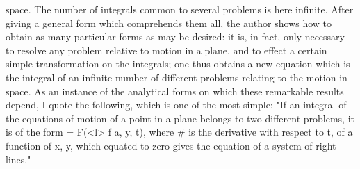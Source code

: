 \documentclass[12pt,a4paper]{article}
\theoremstyle{definition}
\begin{document}
space. The number of integrals common to several problems is here infinite. After
giving a general form which comprehends them all, the author shows how to obtain
as many particular forms as may be desired: it is, in fact, only necessary to resolve
any problem relative to motion in a plane, and to effect a certain simple transformation
on the integrals; one thus obtains a new equation which is the integral of an
infinite number of different problems relating to the motion in space.
As an instance of the analytical forms on which these remarkable results depend,
I quote the following, which is one of the most simple: "If an integral of the
equations of motion of a point in a plane belongs to two different problems, it is of
the form
=
F(<l> f a, y, t),
where # is the derivative with respect to t, of a function of x, y, which equated to
zero gives the equation of a system of right lines."


\end{document}
